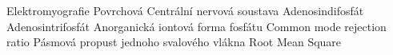            {Elektromyografie}
          {Povrchová }
           {Centrální nervová soustava}
           {Adenosindifosfát}
           {Adenosintrifosfát}
  {Anorganická iontová forma fosfátu}
          {Common mode rejection ratio}
            {Pásmová propust}
         { jednoho svalového vlákna}
           {Root Mean Square}
